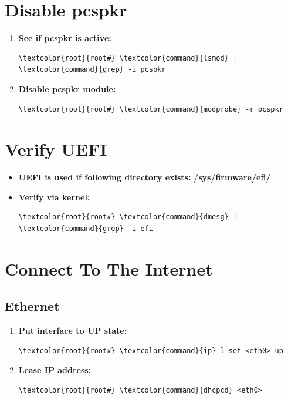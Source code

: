 \documentclass[10pt, a4paper, onecolumn, oneside, titlepage, openany]{book}
\begin{document}
\section{Disable pcspkr}
\begin{enumerate}
    \item \textbf{See if pcspkr is active:}  
\begin{Verbatim}[commandchars=\\\{\}]
\textcolor{root}{root#} \textcolor{command}{lsmod} | \textcolor{command}{grep} -i pcspkr
\end{Verbatim}
    \item \textbf{Disable pcspkr module:}
\begin{Verbatim}[commandchars=\\\{\}]
\textcolor{root}{root#} \textcolor{command}{modprobe} -r pcspkr
\end{Verbatim}
\end{enumerate}

\section{Verify UEFI}
\begin{itemize}
    \item \textbf{UEFI is used if following directory exists:}
\newline \textbf{\textcolor{dir}{/sys/firmware/efi/}}
    \item \textbf{Verify via kernel:}
\begin{Verbatim}[commandchars=\\\{\}]
\textcolor{root}{root#} \textcolor{command}{dmesg} | \textcolor{command}{grep} -i efi
\end{Verbatim}
\end{itemize}

\section{Connect To The Internet}
\subsection{Ethernet}
\begin{enumerate}
    \item \textbf{Put interface to UP state:}
\begin{Verbatim}[commandchars=\\\{\}]
\textcolor{root}{root#} \textcolor{command}{ip} l set <eth0> up
\end{Verbatim}
    \item \textbf{Lease IP address:}
\begin{Verbatim}[commandchars=\\\{\}]
\textcolor{root}{root#} \textcolor{command}{dhcpcd} <eth0>
\end{Verbatim}
\end{enumerate}
\end{document}

